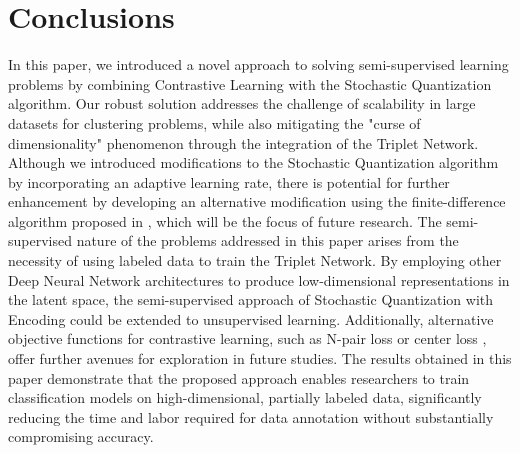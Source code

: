 \section{Conclusions}

In this paper, we introduced a novel approach to solving semi-supervised learning problems by combining Contrastive Learning with the Stochastic Quantization algorithm. Our robust solution addresses the challenge of scalability in large datasets for clustering problems, while also mitigating the "curse of dimensionality" phenomenon through the integration of the Triplet Network. Although we introduced modifications to the Stochastic Quantization algorithm by incorporating an adaptive learning rate, there is potential for further enhancement by developing an alternative modification using the finite-difference algorithm proposed in \cite{Norkin_Kozyriev_Norkin_2024}, which will be the focus of future research. The semi-supervised nature of the problems addressed in this paper arises from the necessity of using labeled data to train the Triplet Network. By employing other Deep Neural Network architectures to produce low-dimensional representations in the latent space, the semi-supervised approach of Stochastic Quantization with Encoding could be extended to unsupervised learning. Additionally, alternative objective functions for contrastive learning, such as N-pair loss \cite{Sohn_2016} or center loss \cite{qi2017}, offer further avenues for exploration in future studies. The results obtained in this paper demonstrate that the proposed approach enables researchers to train classification models on high-dimensional, partially labeled data, significantly reducing the time and labor required for data annotation without substantially compromising accuracy.

